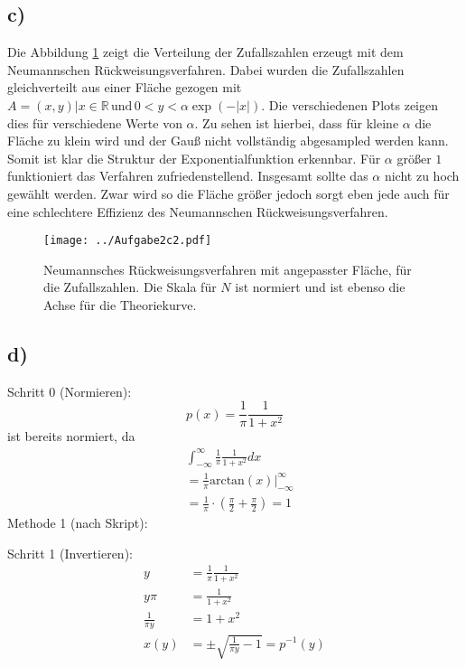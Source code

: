 \subsection*{c)}
Die Abbildung \ref{2c} zeigt die Verteilung der Zufallszahlen erzeugt mit dem Neumannschen Rückweisungsverfahren.
Dabei wurden die Zufallszahlen gleichverteilt aus einer Fläche gezogen mit\\ 
$A = {(x,y)|x \in \mathbb{R} \, \text{und} \, 0 < y < \alpha \exp{(-|x|)}}$.
Die verschiedenen Plots zeigen dies für verschiedene Werte von $\alpha$.
Zu sehen ist hierbei, dass für kleine $\alpha$ die Fläche zu klein wird und der Gauß nicht vollständig abgesampled werden kann.
Somit ist klar die Struktur der Exponentialfunktion erkennbar.
Für $\alpha$ größer $1$ funktioniert das Verfahren zufriedenstellend.
Insgesamt sollte das $\alpha$ nicht zu hoch gewählt werden.
Zwar wird so die Fläche größer jedoch sorgt eben jede auch für eine schlechtere Effizienz des Neumannschen Rückweisungsverfahren.

\newpage
\begin{figure}
	\centering
	\texttt{[image: ../Aufgabe2c2.pdf]}
	\caption{Neumannsches Rückweisungsverfahren mit angepasster Fläche, für die Zufallszahlen. Die Skala für $N$ ist normiert und ist ebenso die Achse für die Theoriekurve.}
	\label{2c}
\end{figure}
\FloatBarrier

\subsection*{d)}
Schritt 0 (Normieren):
\begin{equation}
	p(x) = \frac{1}{\pi} \frac{1}{1+x^2}
	\label{p}
\end{equation}
ist bereits normiert, da
\begin{align*}
	&\int_{-\infty}^{\infty} \frac{1}{\pi} \frac{1}{1+x^2} dx \\
	&= \frac{1}{\pi} \left. \mathrm{arctan}(x) \right \vert_{-\infty}^{\infty}\\
	&= \frac{1}{\pi} \cdot \left(\frac{\pi}{2} + \frac{\pi}{2} \right) = 1
\end{align*}
Methode 1 (nach Skript):

Schritt 1 (Invertieren):
\begin{align*}
	y &= \frac{1}{\pi} \frac{1}{1+x^2} \\
	y \pi &= \frac{1}{1+x^2} \\
	\frac{1}{\pi y} &= 1+x^2 \\
	x(y) &= \pm \sqrt{\frac{1}{\pi y} - 1} = p^{-1}(y)
\end{align*}

